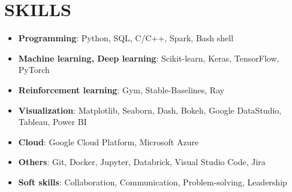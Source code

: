 \documentclass[12pt,a4paper,roman]{moderncv}
\begin{document}
{{{{%

\section{SKILLS}
{
\begin{itemize}
    \item \textbf{Programming}: Python, SQL, C/C++, Spark, Bash shell
    \item \textbf{Machine learning, Deep learning}: Scikit-learn, Keras, TensorFlow, PyTorch
    \item \textbf{Reinforcement learning}: Gym, Stable-Baselines, Ray
    \item \textbf{Visualization}: Matplotlib, Seaborn, Dash, Bokeh, Google DataStudio, Tableau, Power BI
    \item \textbf{Cloud}: Google Cloud Platform, Microsoft Azure
    \item \textbf{Others}: Git, Docker, Jupyter, Databrick, Visual Studio Code, Jira
    \item \textbf{Soft skills}: Collaboration, Communication, Problem-solving, Leadership
\end{itemize}
}

}}}}
\end{document}
